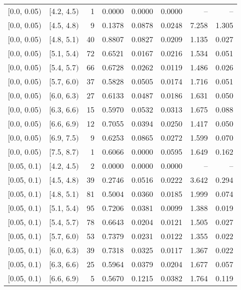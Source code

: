 \begin{longtable}{| l | l | r | r | r | r | r | r |}
        $[$0.0, 0.05$)$ & $[$4.2, 4.5$)$ & 1 & 0.0000 & 0.0000 & 0.0000 & -- & -- \\
        $[$0.0, 0.05$)$ & $[$4.5, 4.8$)$ & 9 & 0.1378 & 0.0878 & 0.0248 & 7.258 & 1.305 \\
        $[$0.0, 0.05$)$ & $[$4.8, 5.1$)$ & 40 & 0.8807 & 0.0827 & 0.0209 & 1.135 & 0.027 \\
        $[$0.0, 0.05$)$ & $[$5.1, 5.4$)$ & 72 & 0.6521 & 0.0167 & 0.0216 & 1.534 & 0.051 \\
        $[$0.0, 0.05$)$ & $[$5.4, 5.7$)$ & 66 & 0.6728 & 0.0262 & 0.0119 & 1.486 & 0.026 \\
        $[$0.0, 0.05$)$ & $[$5.7, 6.0$)$ & 37 & 0.5828 & 0.0505 & 0.0174 & 1.716 & 0.051 \\
        $[$0.0, 0.05$)$ & $[$6.0, 6.3$)$ & 27 & 0.6133 & 0.0487 & 0.0186 & 1.631 & 0.050 \\
        $[$0.0, 0.05$)$ & $[$6.3, 6.6$)$ & 15 & 0.5970 & 0.0532 & 0.0313 & 1.675 & 0.088 \\
        $[$0.0, 0.05$)$ & $[$6.6, 6.9$)$ & 12 & 0.7055 & 0.0394 & 0.0250 & 1.417 & 0.050 \\
        $[$0.0, 0.05$)$ & $[$6.9, 7.5$)$ & 9 & 0.6253 & 0.0865 & 0.0272 & 1.599 & 0.070 \\
        $[$0.0, 0.05$)$ & $[$7.5, 8.7$)$ & 1 & 0.6066 & 0.0000 & 0.0595 & 1.649 & 0.162 \\
        $[$0.05, 0.1$)$ & $[$4.2, 4.5$)$ & 2 & 0.0000 & 0.0000 & 0.0000 & -- & -- \\
        $[$0.05, 0.1$)$ & $[$4.5, 4.8$)$ & 39 & 0.2746 & 0.0516 & 0.0222 & 3.642 & 0.294 \\
        $[$0.05, 0.1$)$ & $[$4.8, 5.1$)$ & 81 & 0.5004 & 0.0360 & 0.0185 & 1.999 & 0.074 \\
        $[$0.05, 0.1$)$ & $[$5.1, 5.4$)$ & 95 & 0.7206 & 0.0381 & 0.0099 & 1.388 & 0.019 \\
        $[$0.05, 0.1$)$ & $[$5.4, 5.7$)$ & 78 & 0.6643 & 0.0204 & 0.0121 & 1.505 & 0.027 \\
        $[$0.05, 0.1$)$ & $[$5.7, 6.0$)$ & 53 & 0.7379 & 0.0231 & 0.0122 & 1.355 & 0.022 \\
        $[$0.05, 0.1$)$ & $[$6.0, 6.3$)$ & 39 & 0.7318 & 0.0325 & 0.0117 & 1.367 & 0.022 \\
        $[$0.05, 0.1$)$ & $[$6.3, 6.6$)$ & 25 & 0.5964 & 0.0379 & 0.0204 & 1.677 & 0.057 \\
        $[$0.05, 0.1$)$ & $[$6.6, 6.9$)$ & 5 & 0.5670 & 0.1215 & 0.0382 & 1.764 & 0.119 \\

\end{longtable}
